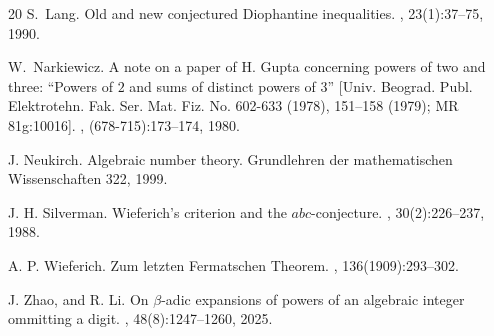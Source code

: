 \documentclass[12pt]{amsart}
\theoremstyle{plain}
\theoremstyle{definition}
\theoremstyle{remark}
\numberwithin{equation}{section}
\begin{document}
\begin{thebibliography}{20}
		S.~Lang.
		\newblock Old and new conjectured {D}iophantine inequalities.
		, 23(1):37--75, 1990.
		
		W.~Narkiewicz.
		\newblock A note on a paper of {H}. {G}upta concerning powers of two and three:
		``{P}owers of {$2$} and sums of distinct powers of {$3$}'' [{U}niv.
		{B}eograd. {P}ubl. {E}lektrotehn. {F}ak. {S}er. {M}at. {F}iz. {N}o. 602-633
		(1978), 151--158 (1979); {MR} 81g:10016].
		,
		(678-715):173--174, 1980.
		
		J. Neukirch. 
		\newblock Algebraic number theory.
		 Grundlehren der mathematischen Wissenschaften 322, 1999.
		
		J. H. Silverman. 
		\newblock Wieferich's criterion and the {$abc$}-conjecture.
		, 30(2):226--237, 1988.
		
		A. P. Wieferich. 
		\newblock Zum letzten Fermatschen Theorem.
		, 136(1909):293--302.
		
		J. Zhao, and R. Li. 
		\newblock On $\beta$-adic expansions of powers of an algebraic integer ommitting a digit.
		, 48(8):1247--1260, 2025. 			
		
	\end{thebibliography}
	
	
	
\end{document}
